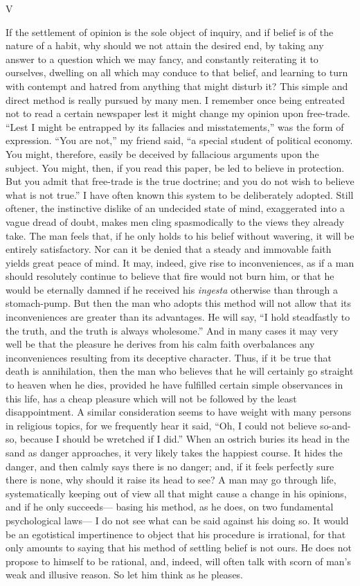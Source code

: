 \documentclass[]{article}
\newcommand{\itemsection}[1]{\bigskip\centerline{#1}\nopagebreak}
\begin{document}
\itemsection{V}

If the settlement of opinion is the sole object of inquiry, and if belief is of the nature of a habit, why should we not attain the desired end, by taking any answer to a question which we may fancy, and constantly reiterating it to ourselves, dwelling on all which may conduce to that belief, and learning to turn with contempt and hatred from anything that might disturb it? This simple and direct method is really pursued by many men. I remember once being entreated not to read a certain newspaper lest it might change my opinion upon free-trade. ``Lest I might be entrapped by its fallacies and misstatements,'' was the form of expression. ``You are not,'' my friend said, ``a special student of political economy. You might, therefore, easily be deceived by fallacious arguments upon the subject. You might, then, if you read this paper, be led to believe in protection. But you admit that free-trade is the true doctrine; and you do not wish to believe what is not true.'' I have often known this system to be deliberately adopted. Still oftener, the instinctive dislike of an undecided state of mind, exaggerated into a vague dread of doubt, makes men cling spasmodically to the views they already take. The man feels that, if he only holds to his belief without wavering, it will be entirely satisfactory. Nor can it be denied that a steady and immovable faith yields great peace of mind. It may, indeed, give rise to inconveniences, as if a man should resolutely continue to believe that fire would not burn him, or that he would be eternally damned if he received his \emph{ingesta} otherwise than through a stomach-pump. But then the man who adopts this method will not allow that its inconveniences are greater than its advantages. He will say, ``I hold steadfastly to the truth, and the truth is always wholesome.'' And in many cases it may very well be that the pleasure he derives from his calm faith overbalances any inconveniences resulting from its deceptive character. Thus, if it be true that death is annihilation, then the man who believes that he will certainly go straight to heaven when he dies, provided he have fulfilled certain simple observances in this life, has a cheap pleasure which will not be followed by the least disappointment. A similar consideration seems to have weight with many persons in religious topics, for we frequently hear it said, ``Oh, I could not believe so-and-so, because I should be wretched if I did.'' When an ostrich buries its head in the sand as danger approaches, it very likely takes the happiest course. It hides the danger, and then calmly says there is no danger; and, if it feels perfectly sure there is none, why should it raise its head to see? A man may go through life, systematically keeping out of view all that might cause a change in his opinions, and if he only succeeds--- basing his method, as he does, on two fundamental psychological laws--- I do not see what can be said against his doing so. It would be an egotistical impertinence to object that his procedure is irrational, for that only amounts to saying that his method of settling belief is not ours. He does not propose to himself to be rational, and, indeed, will often talk with scorn of man's weak and illusive reason. So let him think as he pleases.
\end{document}
